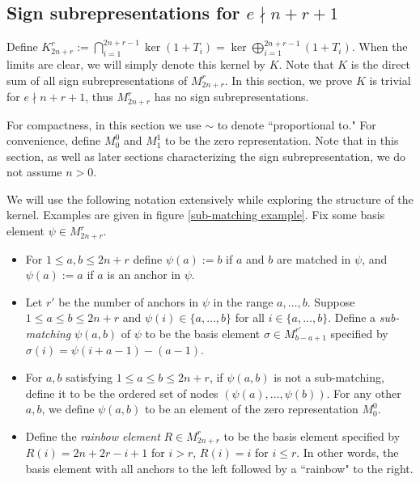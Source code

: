 \documentclass{amsart}
\begin{document}
\subsection{Sign subrepresentations for $e\nmid n+r+1$}
\label{kernel}

Define $K_{2n+r}^r := \bigcap_{i=1}^{2n+r-1} \ker (1 + T_i) = \ker \bigoplus_{i = 1}^{2n + r - 1} (1 + T_i)$. When the limits are clear, we will simply denote this kernel by $K$. Note that $K$ is the direct sum of all sign subrepresentations of $M_{2n+r}^r$. In this section, we prove $K$ is trivial for $e \nmid n + r + 1$, thus $M_{2n+r}^r$ has no sign subrepresentations.

For compactness, in this section we use $\sim $ to denote ``proportional to." For convenience, define $M_0^0$ and $M_1^1$ to be the zero representation. Note that in this section, as well as later sections characterizing the sign subrepresentation, we do not assume $n>0$.

\begin{definition}
	We will use the following notation extensively while exploring the structure of the kernel. Examples are given in figure \ref{sub-matching example}. Fix some basis element $\psi\in M_{2n+r}^r$. 
	
	
	\begin{itemize}
		\item For $1 \leq a,b \leq 2n + r$ define $\psi(a):=b$ if $a$ and $b$ are matched in $\psi$, and $\psi(a):=a$ if $a$ is an anchor in $\psi$. 
		
		
		\item Let $r'$ be the number of anchors in $\psi$ in the range $a,\ldots,b$. Suppose $1\leq a\leq b\leq 2n+r$ and $\psi(i)\in \{a,\ldots,b\}$ for all $i\in \{a,\ldots,b\}$. Define a \emph{sub-matching} $\psi(a,b)$ of $\psi$ to be the basis element $\sigma\in M_{b-a+1}^{r'}$ specified by $\sigma(i)=\psi(i+a-1)-(a-1)$.
		
		\item For $a,b$ satisfying $1\leq a\leq b\leq 2n+r$, if $\psi(a,b)$ is not a sub-matching, define it to be the ordered set of nodes $(\psi(a),\ldots,\psi(b))$. For any other $a,b$, we define $\psi(a,b)$ to be an element of the zero representation $M_0^0$.
		
		\item Define the \emph{rainbow element} $R\in M_{2n+r}^r$ to be the basis element specified by $R(i)=2n+2r-i+1$ for $i>r$, $R(i)=i$ for $i\leq r$. In other words, the basis element with all anchors to the left followed by a ``rainbow" to the right.
	\end{itemize}
	
	\label{sub-matchings}
\end{definition}
\end{document}
